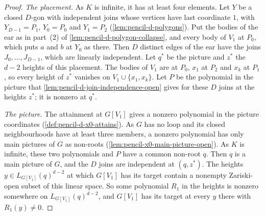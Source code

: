 \begin{proof}
  \leanok
  \emph{The placement.} As $K$ is infinite, it has at least four
  elements. Let $Y$ be a closed $D$-gon with independent joins whose
  vertices have last coordinate $1$, with $Y_{D-1} = P_1$, $Y_0 = P_0$
  and $Y_1 = P_2$ (\cref{lem:pencil-d-polygons}). Put the bodies of the
  ear as in part~(2) of \cref{lem:pencil-d-polygon-collapse}, and every
  body of $V_1$ at $P_0$, which puts $a$ and $b$ at $Y_0$ as there. Then
  $D$ distinct edges of the ear have the joins $J_0, \dots, J_{D-1}$,
  which are linearly independent. Let $q^*$ be the picture and $z^*$ the
  $d - 2$ heights of this placement. The bodies of $V_1$ are at $P_0$,
  $x_1$ at $P_2$ and $x_k$ at $P_1$, so every height of $z^*$ vanishes on
  $V_1 \cup \{x_1, x_k\}$. Let $P$ be the polynomial in the picture that
  \cref{lem:pencil-d-join-independence-open} gives for these $D$ joins
  at the heights $z^*$; it is nonzero at $q^*$.

  \emph{The picture.} The attainment at $G[V_1]$ gives a nonzero
  polynomial in the picture coordinates (\cref{def:pencil-d-x0-attains}).
  As $G$ has no loop and its closed neighbourhoods have at least three
  members, a nonzero polynomial has only main pictures of $G$ as
  non-roots (\cref{lem:pencil-x0-main-picture-open}). As $K$ is
  infinite, these two polynomials and $P$ have a common non-root $q$.
  Then $q$ is a main picture of $G$, and the $D$ joins are independent at
  $(q, z^*)$. The heights $y \in L_{G[V_1]}(q)^{d-2}$ at which $G[V_1]$
  has its target contain a nonempty Zariski-open subset of this linear
  space. So some polynomial $R_1$ in the heights is nonzero somewhere on
  $L_{G[V_1]}(q)^{d-2}$, and $G[V_1]$ has its target at every $y$ there
  with $R_1(y) \neq 0$.


\end{proof}
